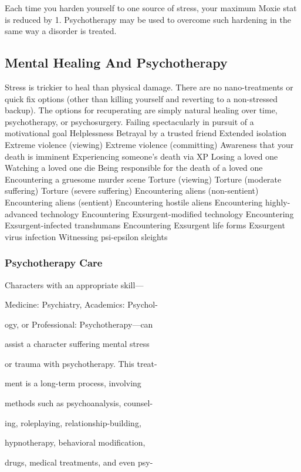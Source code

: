 Each time you harden yourself to one source of 
stress, your maximum Moxie stat is reduced by 1. 
Psychotherapy may be used to overcome such hardening
in the same way a disorder is treated.

\subsection{Mental Healing And Psychotherapy}

Stress is trickier to heal than physical damage. There 
are no nano-treatments or quick fix options (other 
than killing yourself and reverting to a non-stressed 
backup). The options for recuperating are simply natural
healing over time, psychotherapy, or psychosurgery.
Failing spectacularly in pursuit of a motivational goal
Helplessness
Betrayal by a trusted friend
Extended isolation
Extreme violence (viewing)
Extreme violence (committing)
Awareness that your death is imminent
Experiencing someone's death via XP
Losing a loved one
Watching a loved one die
Being responsible for the death of a loved one
Encountering a gruesome murder scene
Torture (viewing)
Torture (moderate suffering)
Torture (severe suffering)
Encountering aliens (non-sentient)
Encountering aliens (sentient)
Encountering hostile aliens
Encountering highly-advanced technology
Encountering Exsurgent-modified technology
Encountering Exsurgent-infected transhumans
Encountering Exsurgent life forms
Exsurgent virus infection
Witnessing psi-epsilon sleights

\subsubsection{Psychotherapy Care}


Characters with an appropriate skill—

Medicine: Psychiatry, Academics: Psychol-

ogy, or Professional: Psychotherapy—can 

assist a character suffering mental stress 

or trauma with psychotherapy. This treat-

ment is a long-term process, involving 

methods such as psychoanalysis, counsel-

ing, roleplaying, relationship-building, 

hypnotherapy, behavioral modification, 

drugs, medical treatments, and even psy-

